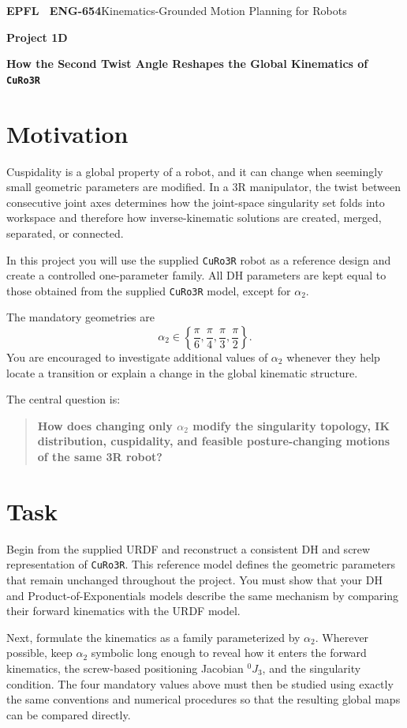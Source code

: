 \documentclass[11pt,a4paper]{article}
\begin{document}
{\small\textbf{EPFL \textbar\ ENG-654}\hfill Kinematics-Grounded Motion Planning for Robots}
\vspace{5mm}

{\color{epflred}\Large\bfseries Project 1D}

{\LARGE\bfseries How the Second Twist Angle Reshapes the Global Kinematics of \texttt{CuRo3R}\par}

\section*{Motivation}
Cuspidality is a global property of a robot, and it can change when seemingly small geometric parameters are modified. In a 3R manipulator, the twist between consecutive joint axes determines how the joint-space singularity set folds into workspace and therefore how inverse-kinematic solutions are created, merged, separated, or connected.

In this project you will use the supplied \texttt{CuRo3R} robot as a reference design and create a controlled one-parameter family. All DH parameters are kept equal to those obtained from the supplied \texttt{CuRo3R} model, except for $\alpha_2$.

The mandatory geometries are
\[
\alpha_2\in\left\{\frac{\pi}{6},\frac{\pi}{4},\frac{\pi}{3},\frac{\pi}{2}\right\}.
\]
You are encouraged to investigate additional values of $\alpha_2$ whenever they help locate a transition or explain a change in the global kinematic structure.

The central question is:
\begin{quote}
\textbf{How does changing only $\alpha_2$ modify the singularity topology, IK distribution, cuspidality, and feasible posture-changing motions of the same 3R robot?}
\end{quote}

\section*{Task}
Begin from the supplied URDF and reconstruct a consistent DH and screw representation of \texttt{CuRo3R}. This reference model defines the geometric parameters that remain unchanged throughout the project. You must show that your DH and Product-of-Exponentials models describe the same mechanism by comparing their forward kinematics with the URDF model.

Next, formulate the kinematics as a family parameterized by $\alpha_2$. Wherever possible, keep $\alpha_2$ symbolic long enough to reveal how it enters the forward kinematics, the screw-based positioning Jacobian $^{0}J_3$, and the singularity condition. The four mandatory values above must then be studied using exactly the same conventions and numerical procedures so that the resulting global maps can be compared directly.
\end{document}
